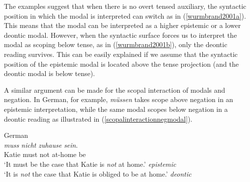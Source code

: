 %

\noindent The examples suggest that when there is no overt tensed auxiliary, the syntactic position in which the modal is interpreted can switch as in (\ref{wurmbrand2001a}). This means that the modal can be interpreted as a higher epistemic or a lower deontic modal. However, when the syntactic surface forces us to interpret the modal as scoping below tense, as in (\ref{wurmbrand2001b}), only the deontic reading survives. This can be easily explained if we assume that the syntactic position of the epistemic modal is located above the tense projection (and the deontic modal is below tense). 

A similar argument can be made for the scopal interaction of modals and negation. In German, for example, \textit{müssen} takes scope above negation in an epistemic interpretation, while the same modal scopes below negation in a deontic reading as illustrated in (\ref{scopalinteractionnegmodal}).

\begin{exe} 
\ex German \\  {\textit{muss}} {\textit{nicht}} {\textit{zuhause}} {\textit{sein}.} \\
{Katie} {must} {not} {at-home} {be} \\
\trans `It must be the case that Katie is \textit{not} at home.' \hfill{\textit{epistemic}}\label{scopalinteractionnegmodal} \\
`It is \textit{not} the case that Katie is obliged to be at home.' \hfill{\textit{deontic}}
\end{exe} 

